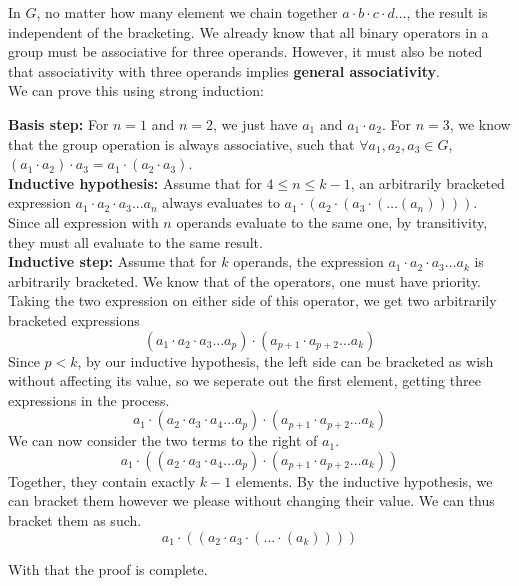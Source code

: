 \documentclass[12pt]{article}
\begin{document}
    In $G$, no matter how many element we chain together
    $a \cdot b \cdot c \cdot d \dots$,
    the result is independent of the bracketing.
    We already know that all binary operators in a group must be
    associative for three operands.
    However, it must also be noted
    that associativity with three operands
    implies \textbf{general associativity}. \\ 
    We can prove this using strong induction: \\
    \begin{adjustwidth}{1cm}{1cm} %
        \textbf{Basis step:}
        For $n = 1$ and $n = 2$, we just have $a_1$ and $a_1 \cdot a_2$.
        For $n = 3$, we know that the group operation is always
        associative, such that $\forall a_1, a_2, a_3 \in G$,
        $(a_1 \cdot a_2) \cdot a_3 = a_1 \cdot (a_2 \cdot a_3)$. \\
        \textbf{Inductive hypothesis:}
        Assume that for $4 \leqslant n \leqslant k-1$,
        an arbitrarily bracketed expression
        $a_1 \cdot a_2 \cdot a_3 \dots a_n$
        always evaluates to 
        $a_1 \cdot (a_2 \cdot (a_3 \cdot (\dots (a_n))))$.
        Since all expression with $n$ operands evaluate to the same one,
        by transitivity, they must all evaluate to the same result. \\
        \textbf{Inductive step:}
        Assume that for $k$ operands,
        the expression $a_1 \cdot a_2 \cdot a_3 \dots a_k$
        is arbitrarily bracketed.
        We know that of the operators, one must have priority.
        Taking the two expression on either side of this operator,
        we get two arbitrarily bracketed expressions
        \[(a_1 \cdot a_2 \cdot a_3 \dots a_p)
        \cdot (a_{p+1} \cdot a_{p+2} \dots a_k)\]
        Since $p < k$,
        by our inductive hypothesis,
        the left side can be bracketed as wish without affecting its value,
        so we seperate out the first element,
        getting three expressions in the process.
        \[a_1 \cdot (a_2 \cdot a_3 \cdot a_4 \dots a_p)
        \cdot (a_{p+1} \cdot a_{p+2} \dots a_k)\]
        We can now consider the two terms to the right of $a_1$.
        \[a_1 \cdot ((a_2 \cdot a_3 \cdot a_4 \dots a_p)
        \cdot (a_{p+1} \cdot a_{p+2} \dots a_k))\]
        Together, they contain exactly $k-1$ elements.
        By the inductive hypothesis,
        we can bracket them however we please without changing their value.
        We can thus bracket them as such.
        \[a_1 \cdot ((a_2 \cdot a_3 \cdot ( \dots
        \cdot (a_k))))\]
    \end{adjustwidth}
    With that the proof is complete. \\
\end{document}
